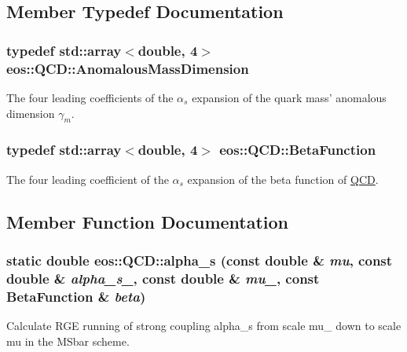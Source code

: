 \subsection{Member Typedef Documentation}
\hypertarget{classeos_1_1QCD_a3ca5eea2df0bd5c0043071e14c58d089}{
\subsubsection[{AnomalousMassDimension}]{\setlength{\rightskip}{0pt plus 5cm}typedef std::array$<$double, 4$>$ {\bf eos::QCD::AnomalousMassDimension}}}
\label{classeos_1_1QCD_a3ca5eea2df0bd5c0043071e14c58d089}


The four leading coefficients of the $\alpha_s$ expansion of the quark mass' anomalous dimension $\gamma_m$. \hypertarget{classeos_1_1QCD_a1261bb4643fea3012beb0a9ea78b7dea}{
\subsubsection[{BetaFunction}]{\setlength{\rightskip}{0pt plus 5cm}typedef std::array$<$double, 4$>$ {\bf eos::QCD::BetaFunction}}}
\label{classeos_1_1QCD_a1261bb4643fea3012beb0a9ea78b7dea}


The four leading coefficient of the $\alpha_s$ expansion of the beta function of \hyperlink{classeos_1_1QCD}{QCD}. 

\subsection{Member Function Documentation}
\hypertarget{classeos_1_1QCD_a65cf274c0bcedec2189f6836eebb4a7a}{
\subsubsection[{alpha\_\-s}]{\setlength{\rightskip}{0pt plus 5cm}static double eos::QCD::alpha\_\-s (const double \& {\em mu}, \/  const double \& {\em alpha\_\-s\_}, \/  const double \& {\em mu\_}, \/  const {\bf BetaFunction} \& {\em beta})}}
\label{classeos_1_1QCD_a65cf274c0bcedec2189f6836eebb4a7a}
Calculate RGE running of strong coupling alpha\_\-s from scale mu\_ down to scale mu in the MSbar scheme.

